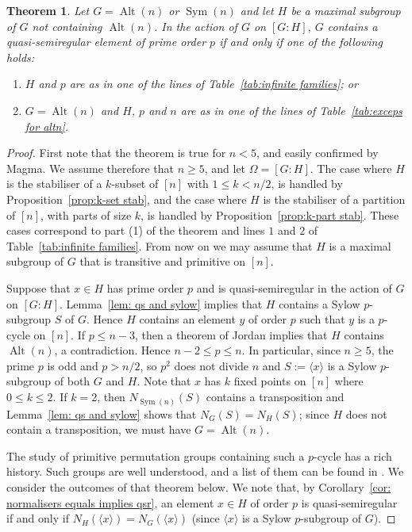 \documentclass{article}
\newtheorem{thm}{Theorem}[section]
\theoremstyle{remark}
\theoremstyle{definition}
\DeclareMathOperator{\Alt}{Alt}
\DeclareMathOperator{\Sym}{Sym}
\newcommand{\qsr}{quasi-semiregular}
\newcommand{\qsre}{quasi-semiregular element}
\begin{document}
 


\begin{thm}
\label{thm:alt or sym}
Let $G = \Alt(n)$ or $\Sym(n)$ and let $H$ be a maximal subgroup of $G$ not containing $\Alt(n)$. In the action of $G$ on $[G:H]$, $G$ contains a {\qsre} of prime order $p$ if and only if one of the following holds:
\begin{enumerate}[(1)]
\item $H$ and $p$ are as in one of the lines of Table~\ref{tab:infinite families}; or
\item $G=\Alt(n)$ and $H$, $p$ and $n$ are as in one of the lines of Table~\ref{tab:exceps for altn}.
\end{enumerate}
\end{thm}

\begin{proof}
First note that the theorem is true for $n<5$, and easily confirmed by {\sc Magma}. We assume therefore that $n\geqslant 5$, and let $\Omega = [G:H]$. The case where  
$H$ is the stabiliser of a $k$-subset of $[n]$ with $1\leqslant k < n/2$, is handled by Proposition~\ref{prop:k-set stab}, and the case where $H$ is the stabiliser of a  partition of $[n]$, with parts of size $k$, is handled by Proposition~\ref{prop:k-part stab}. These cases correspond to part  (1)  of the theorem and lines $1$  and $2$ of Table~\ref{tab:infinite families}. From now on we may assume that $H$ is a maximal subgroup of $G$ that is transitive and primitive on $[n]$.



 
Suppose that $x\in H$ has prime order $p$ and is {\qsr} in the action of $G$ on $[G:H]$. Lemma~\ref{lem: qs and sylow} implies that $H$ contains a Sylow $p$-subgroup $S$ of $G$. Hence $H$ contains an element $y$ of order $p$ such that $y$ is a $p$-cycle on $[n]$. If $p \leqslant n-3$, then a theorem of Jordan \cite[Theorem 3.3E]{DixonMortimer} implies that $H$ contains $\Alt(n)$, a contradiction. Hence $n-2 \leqslant p \leqslant n$. In particular, since $n\geqslant 5$, the prime $p$ is odd and $p>n/2$, so $p^2$ does not divide $n$ and $S:=\langle x \rangle$ is a Sylow $p$-subgroup of both $G$ and $H$. Note that  $x$ has $k$ fixed points on $[n]$ where $0 \leqslant k \leqslant 2$. If $k=2$, then  $N_{\Sym(n)}(S)$ contains a transposition and Lemma~\ref{lem: qs and sylow} shows that $N_G(S) =  N_H(S) $; since $H$ does not contain a transposition, we must have $G = \Alt(n)$.

The study of primitive permutation groups containing such a  $p$-cycle has a rich history. Such groups are well understood, and a list of them  can be found in \cite[Theorem 1.2]{Jones}. We consider the outcomes of that theorem below.   We note that, by Corollary~\ref{cor: normalisers equals implies qsr}, an element $x\in H$ of order $p$ is {\qsr} if and only if $N_H(\langle x \rangle)=N_G(\langle x \rangle)$ (since $\langle x \rangle$ is a Sylow $p$-subgroup of $G$). 


\end{proof}
\end{document}

